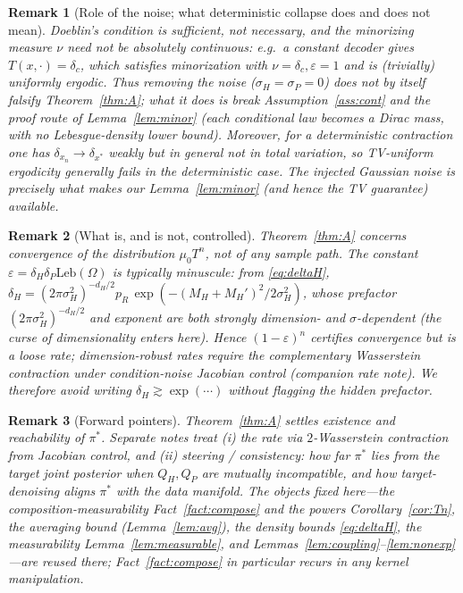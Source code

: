 \documentclass[11pt]{article}
\theoremstyle{definitionbreak}
\theoremstyle{plainbreak}
\theoremstyle{remarkbreak}
\newtheorem{remark}{Remark}[section]
\newcommand{\Om}{\Omega}
\newcommand{\Leb}{\mathrm{Leb}}
\begin{document}
\begin{remark}[Role of the noise; what deterministic collapse does and does not mean]
\label{rem:noise}
Doeblin's condition is \emph{sufficient}, not necessary, and the minorizing measure $\nu$ need not
be absolutely continuous: e.g.\ a constant decoder gives $T(x,\cdot)=\delta_c$, which satisfies
minorization with $\nu=\delta_c,\varepsilon=1$ and is (trivially) uniformly ergodic. Thus removing
the noise ($\sigma_H=\sigma_P=0$) does not by itself falsify Theorem~\ref{thm:A}; what it does is
break Assumption~\ref{ass:cont} and the proof route of Lemma~\ref{lem:minor} (each conditional law
becomes a Dirac mass, with no Lebesgue-density lower bound). Moreover, for a deterministic
contraction one has $\delta_{x_n}\to\delta_{x^\ast}$ \emph{weakly} but in general \emph{not} in
total variation, so TV-uniform ergodicity generally fails in the deterministic case. The injected
Gaussian noise is precisely what makes our Lemma~\ref{lem:minor} (and hence the TV guarantee)
available.
\end{remark}

\begin{remark}[What is, and is not, controlled]
\label{rem:scope}
Theorem~\ref{thm:A} concerns convergence of the \emph{distribution} $\mu_0T^n$, not of any sample
path. The constant $\varepsilon=\delta_H\delta_P\Leb(\Om)$ is typically minuscule: from
\eqref{eq:deltaH}, $\delta_H=(2\pi\sigma_H^2)^{-d_H/2}p_R\,\exp(-(M_H+M_H')^2/2\sigma_H^2)$, whose
prefactor $(2\pi\sigma_H^2)^{-d_H/2}$ and exponent are both strongly dimension- and
$\sigma$-dependent (the curse of dimensionality enters here). Hence $(1-\varepsilon)^n$ certifies
convergence but is a loose rate; dimension-robust rates require the complementary Wasserstein
contraction under condition-noise Jacobian control (companion rate note). We therefore avoid writing
$\delta_H\gtrsim\exp(\cdots)$ without flagging the hidden prefactor.
\end{remark}

\begin{remark}[Forward pointers]
\label{rem:forward}
Theorem~\ref{thm:A} settles existence and reachability of $\pi^\ast$. Separate notes treat (i) the
\emph{rate} via $2$-Wasserstein contraction from Jacobian control, and (ii) \emph{steering /
consistency}: how far $\pi^\ast$ lies from the target joint posterior when $Q_H,Q_P$ are mutually
incompatible, and how target-denoising aligns $\pi^\ast$ with the data manifold. The objects fixed
here---the composition-measurability Fact~\ref{fact:compose} and the powers Corollary~\ref{cor:Tn},
the averaging bound (Lemma~\ref{lem:avg}), the density bounds \eqref{eq:deltaH}, the measurability
Lemma~\ref{lem:measurable}, and Lemmas~\ref{lem:coupling}--\ref{lem:nonexp}---are reused there;
Fact~\ref{fact:compose} in particular recurs in any kernel manipulation.
\end{remark}
\end{document}

